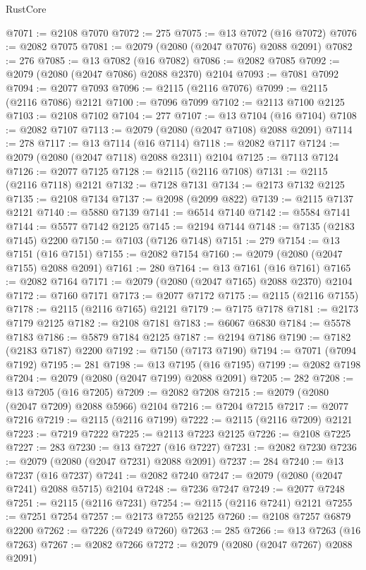 \begin{lexlean}{RustCore}
\begin{coremodule}
@7071 := @2108 @7070
@7072 := 275
@7075 := @13 @7072 (@16 @7072)
@7076 := @2082 @7075
@7081 := @2079 (@2080 (@2047 @7076) @2088 @2091)
@7082 := 276
@7085 := @13 @7082 (@16 @7082)
@7086 := @2082 @7085
@7092 := @2079 (@2080 (@2047 @7086) @2088 @2370) @2104
@7093 := @7081 @7092
@7094 := @2077 @7093
@7096 := @2115 (@2116 @7076)
@7099 := @2115 (@2116 @7086) @2121
@7100 := @7096 @7099
@7102 := @2113 @7100 @2125
@7103 := @2108 @7102
@7104 := 277
@7107 := @13 @7104 (@16 @7104)
@7108 := @2082 @7107
@7113 := @2079 (@2080 (@2047 @7108) @2088 @2091)
@7114 := 278
@7117 := @13 @7114 (@16 @7114)
@7118 := @2082 @7117
@7124 := @2079 (@2080 (@2047 @7118) @2088 @2311) @2104
@7125 := @7113 @7124
@7126 := @2077 @7125
@7128 := @2115 (@2116 @7108)
@7131 := @2115 (@2116 @7118) @2121
@7132 := @7128 @7131
@7134 := @2173 @7132 @2125
@7135 := @2108 @7134
@7137 := @2098 (@2099 @822)
@7139 := @2115 @7137 @2121
@7140 := @5880 @7139
@7141 := @6514 @7140
@7142 := @5584 @7141
@7144 := @5577 @7142 @2125
@7145 := @2194 @7144
@7148 := @7135 (@2183 @7145) @2200
@7150 := @7103 (@7126 @7148)
@7151 := 279
@7154 := @13 @7151 (@16 @7151)
@7155 := @2082 @7154
@7160 := @2079 (@2080 (@2047 @7155) @2088 @2091)
@7161 := 280
@7164 := @13 @7161 (@16 @7161)
@7165 := @2082 @7164
@7171 := @2079 (@2080 (@2047 @7165) @2088 @2370) @2104
@7172 := @7160 @7171
@7173 := @2077 @7172
@7175 := @2115 (@2116 @7155)
@7178 := @2115 (@2116 @7165) @2121
@7179 := @7175 @7178
@7181 := @2173 @7179 @2125
@7182 := @2108 @7181
@7183 := @6067 @6830
@7184 := @5578 @7183
@7186 := @5879 @7184 @2125
@7187 := @2194 @7186
@7190 := @7182 (@2183 @7187) @2200
@7192 := @7150 (@7173 @7190)
@7194 := @7071 (@7094 @7192)
@7195 := 281
@7198 := @13 @7195 (@16 @7195)
@7199 := @2082 @7198
@7204 := @2079 (@2080 (@2047 @7199) @2088 @2091)
@7205 := 282
@7208 := @13 @7205 (@16 @7205)
@7209 := @2082 @7208
@7215 := @2079 (@2080 (@2047 @7209) @2088 @5966) @2104
@7216 := @7204 @7215
@7217 := @2077 @7216
@7219 := @2115 (@2116 @7199)
@7222 := @2115 (@2116 @7209) @2121
@7223 := @7219 @7222
@7225 := @2113 @7223 @2125
@7226 := @2108 @7225
@7227 := 283
@7230 := @13 @7227 (@16 @7227)
@7231 := @2082 @7230
@7236 := @2079 (@2080 (@2047 @7231) @2088 @2091)
@7237 := 284
@7240 := @13 @7237 (@16 @7237)
@7241 := @2082 @7240
@7247 := @2079 (@2080 (@2047 @7241) @2088 @5715) @2104
@7248 := @7236 @7247
@7249 := @2077 @7248
@7251 := @2115 (@2116 @7231)
@7254 := @2115 (@2116 @7241) @2121
@7255 := @7251 @7254
@7257 := @2173 @7255 @2125
@7260 := @2108 @7257 @6879 @2200
@7262 := @7226 (@7249 @7260)
@7263 := 285
@7266 := @13 @7263 (@16 @7263)
@7267 := @2082 @7266
@7272 := @2079 (@2080 (@2047 @7267) @2088 @2091)

\end{coremodule}
\end{lexlean}
